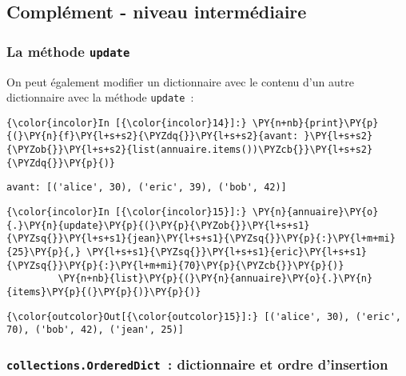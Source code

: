     \hypertarget{compluxe9ment---niveau-intermuxe9diaire}{%
\subsection{Complément - niveau
intermédiaire}\label{compluxe9ment---niveau-intermuxe9diaire}}

    \hypertarget{la-muxe9thode-update}{%
\subsubsection{\texorpdfstring{La méthode
\texttt{update}}{La méthode update}}\label{la-muxe9thode-update}}

    On peut également modifier un dictionnaire avec le contenu d'un autre
dictionnaire avec la méthode \texttt{update}~:

    \begin{Verbatim}[commandchars=\\\{\}]
{\color{incolor}In [{\color{incolor}14}]:} \PY{n+nb}{print}\PY{p}{(}\PY{n}{f}\PY{l+s+s2}{\PYZdq{}}\PY{l+s+s2}{avant: }\PY{l+s+s2}{\PYZob{}}\PY{l+s+s2}{list(annuaire.items())\PYZcb{}}\PY{l+s+s2}{\PYZdq{}}\PY{p}{)}
\end{Verbatim}


    \begin{Verbatim}[commandchars=\\\{\}]
avant: [('alice', 30), ('eric', 39), ('bob', 42)]

    \end{Verbatim}

    \begin{Verbatim}[commandchars=\\\{\}]
{\color{incolor}In [{\color{incolor}15}]:} \PY{n}{annuaire}\PY{o}{.}\PY{n}{update}\PY{p}{(}\PY{p}{\PYZob{}}\PY{l+s+s1}{\PYZsq{}}\PY{l+s+s1}{jean}\PY{l+s+s1}{\PYZsq{}}\PY{p}{:}\PY{l+m+mi}{25}\PY{p}{,} \PY{l+s+s1}{\PYZsq{}}\PY{l+s+s1}{eric}\PY{l+s+s1}{\PYZsq{}}\PY{p}{:}\PY{l+m+mi}{70}\PY{p}{\PYZcb{}}\PY{p}{)}
         \PY{n+nb}{list}\PY{p}{(}\PY{n}{annuaire}\PY{o}{.}\PY{n}{items}\PY{p}{(}\PY{p}{)}\PY{p}{)}
\end{Verbatim}


\begin{Verbatim}[commandchars=\\\{\}]
{\color{outcolor}Out[{\color{outcolor}15}]:} [('alice', 30), ('eric', 70), ('bob', 42), ('jean', 25)]
\end{Verbatim}
            
    \hypertarget{collections.ordereddict-dictionnaire-et-ordre-dinsertion}{%
\subsubsection{\texorpdfstring{\texttt{collections.OrderedDict}~:
dictionnaire et ordre
d'insertion}{collections.OrderedDict~: dictionnaire et ordre d'insertion}}\label{collections.ordereddict-dictionnaire-et-ordre-dinsertion}}

